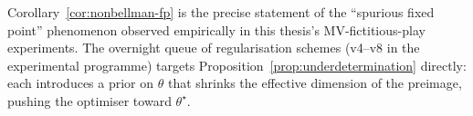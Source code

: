 \documentclass[11pt,a4paper]{article}
\theoremstyle{definition}
\theoremstyle{remark}
\begin{document}
Corollary~\ref{cor:nonbellman-fp} is the precise statement of the
``spurious fixed point'' phenomenon observed empirically in this
thesis's MV-fictitious-play experiments.  The overnight queue
of regularisation schemes (v4--v8 in the experimental programme)
targets Proposition~\ref{prop:underdetermination} directly: each
introduces a prior on $\theta$ that shrinks the effective
dimension of the preimage, pushing the optimiser toward
$\theta^\star$.

\small

\end{document}
